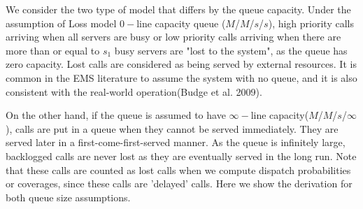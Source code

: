 \documentclass{article}
\begin{document}
We consider the two type of model that differs by the queue capacity. Under the assumption of Loss model $0-$line capacity queue ($M$/$M$/$s$/$s$), high priority calls arriving when all servers are busy or low priority calls arriving when there are more than or equal to $s_1$ busy servers are "lost to the system", as the queue has zero capacity. Lost calls are considered as being served by external resources. It is common in the EMS literature to assume the system with no queue, and it is also  consistent with the real-world operation(Budge et al. 2009). 

On the other hand, if the queue is assumed to have $\infty-$line capacity($M$/$M$/$s$/$\infty$), calls are put in a queue when they cannot be served immediately. They are served later in a first-come-first-served manner. As the queue is infinitely large, backlogged calls are never lost as they are eventually served in the long run. Note that these calls are counted as lost calls when we compute dispatch probabilities or coverages, since these calls are 'delayed' calls. %
Here we show the derivation for both queue size assumptions.
\end{document}
